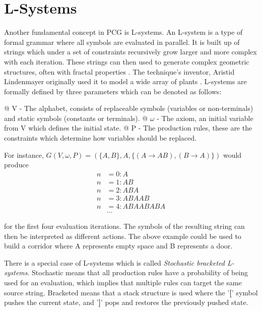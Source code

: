 \section{L-Systems}
\label{chap:lsystem}

Another fundamental concept in PCG is L-systems.
An L-system is a type of formal grammar where all symbols are evaluated in parallel.
It is built up of strings which under a set of constraints recursively grow larger and more complex with each iteration.
These strings can then used to generate complex geometric structures, often with fractal properties \cite{wiki:fractals}.
The technique's inventor, Aristid Lindenmayer originally used it to model a wide array of plants \cite{lsystem_book}.
L-systems are formally defined by three parameters which can be denoted as follows:

\begin{easylist}
  @ V  - The alphabet, consists of replaceable symbols (variables or non-terminals) and static symbols (constants or terminals).
  @ $\omega$ - The axiom, an initial variable from V which defines the initial state.
  @ P - The production rules, these are the constraints which determine how variables should be replaced.
\end{easylist}

For instance, $G(V, \omega, P) = (\{A, B\}, A, \{(A \to AB), (B \to A)\})$ would produce
\begin{align*}
  n &= 0: A \\
  n &= 1: AB \\
  n &= 2: ABA \\
  n &= 3: ABAAB \\
  n &= 4: ABAABABA \\
  &\dots
\end{align*}
\vspace{-1.0cm}

for the first four evaluation iterations. The symbols of the resulting string can then be interpreted as different actions.
The above example could be used to build a corridor where A represents empty space and B represents a door.

There is a special case of L-systems which is called \textit{Stochastic bracketed L-systems}.
Stochastic means that all production rules have a probability of being used for an evaluation, which implies that multiple rules can target the same source string.
Bracketed means that a stack structure is used where the '\textbf{[}' symbol pushes the current state, and '\textbf{]}' pops and restores the previously pushed state.

